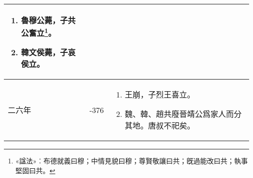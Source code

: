 \begin{longtable}{|>{\centering\scriptsize}m{2em}|>{\centering\scriptsize}m{1.3em}|>{\centering}m{8.8em}|}
\begin{enumerate}
  \item 魯穆公薨，子共公奮立\footnote{«諡法»︰布德就義曰穆；中情見貌曰穆；尊賢敬讓曰共；旣過能改曰共；執事堅固曰共。}。
  \item 韓文侯薨，子哀侯立。
  \end{enumerate} \tabularnewline\hline
  二六年 & -376 & \begin{enumerate}
    \tiny
  \item 王崩，子烈王喜立。
  \item 魏、韓、趙共廢晉靖公爲家人而分其地。唐叔不祀矣。
  \end{enumerate} \tabularnewline
  \bottomrule
\end{longtable}

